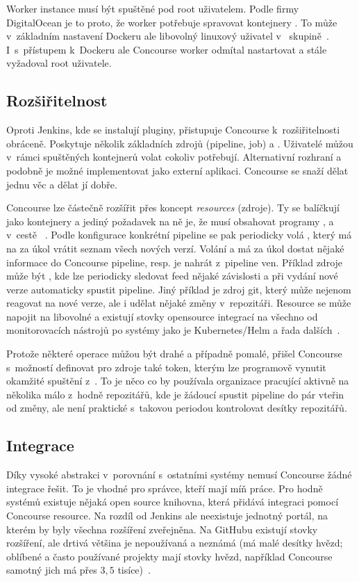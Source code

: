         Worker instance musí být spuštěné pod root uživatelem. Podle firmy DigitalOcean je to proto, že worker potřebuje spravovat kontejnery . To může v~základním nastavení Dockeru ale libovolný linuxový uživatel v~ skupině~\cite{docker-postinstall}. I~s~přístupem k~Dockeru ale Concourse worker odmítal nastartovat a stále vyžadoval root uživatele.

    \subsection{Rozšiřitelnost}
        Oproti Jenkins, kde se instalují pluginy, přistupuje Concourse k~rozšiřitelnosti obráceně. Poskytuje několik základních zdrojů (pipeline, job) a . Uživatelé můžou v~rámci spuštěných kontejnerů volat cokoliv potřebují. Alternativní rozhraní a podobně je možné implementovat jako externí aplikaci. Concourse se snaží dělat jednu věc a dělat jí dobře.

        Concourse lze částečně rozšířit přes koncept \textit{resources} (zdroje). Ty se balíčkují jako kontejnery a jediný požadavek na ně je, že musí obsahovat programy ,  a  v~cestě ~\cite{concourse-resource}. Podle konfigurace konkrétní pipeline se pak periodicky volá , který má na za úkol vrátit seznam všech nových verzí. Volání  a  má za úkol dostat nějaké informace do Concourse pipeline, resp. je nahrát z~pipeline ven. Příklad zdroje může být , kde lze periodicky sledovat feed nějaké závislosti a při vydání nové verze automaticky spustit pipeline. Jiný příklad je zdroj git, který může nejenom reagovat na nové verze, ale i udělat nějaké změny v~repozitáři. Resource se může napojit na libovolné  a existují stovky opensource integrací na všechno od monitorovacích nástrojů po \CD systémy jako je Kubernetes/Helm a řada dalších~\cite{concourse-resource-list}.

        Protože některé  operace můžou být drahé a případně pomalé, přišel Concourse s~možností definovat pro zdroje také token, kterým lze programově vynutit okamžité spuštění  z~. To je něco co by používala organizace pracující aktivně na několika málo z~hodně repozitářů, kde je žádoucí spustit pipeline do pár vteřin od změny, ale není praktické s~takovou periodou kontrolovat desítky repozitářů.

    \subsection{Integrace}
        Díky vysoké abstrakci v~porovnání s~ostatními \CI systémy nemusí Concourse žádné integrace řešit. To je vhodné pro správce, kteří mají míň práce. Pro hodně systémů existuje nějaká open source knihovna, která přidává integraci pomocí Concourse resource. Na rozdíl od Jenkins ale neexistuje jednotný portál, na kterém by byly všechna rozšíření zveřejněna. Na GitHubu existují stovky rozšíření, ale drtivá většina je nepoužívaná a neznámá (má malé desítky hvězd; oblíbené a často používané projekty mají stovky hvězd, například Concourse samotný jich má přes $3,5$ tisíce)~\cite{concourse-resource-list}.

